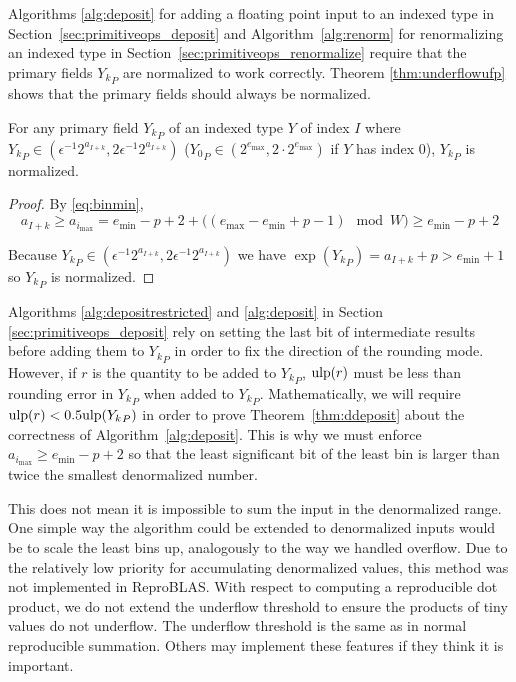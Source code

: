       Algorithms \ref{alg:deposit} for adding a floating point input to an
      indexed type in Section~\ref{sec:primitiveops_deposit} and
      Algorithm~\ref{alg:renorm} for renormalizing an indexed type in
      Section~\ref{sec:primitiveops_renormalize} require that the primary
      fields ${Y_k}_P$ are normalized to work correctly. Theorem
      \ref{thm:underflowufp} shows that the primary fields should always be
      normalized.

      \begin{samepage}
      \begin{thm}
        For any primary field ${Y_k}_P$ of an indexed type $Y$ of index $I$ where ${Y_k}_P \in (\epsilon^{-1} 2^{a_{I + k}}, 2 \epsilon^{-1} 2^{a_{I + k}})$ (${Y_0}_P \in (2^{e_{\max}}, 2 \cdot 2^{e_{\max}})$ if $Y$ has index 0), ${Y_k}_P$ is normalized.
        \label{thm:underflowufp}
      \end{thm}
      \end{samepage}

      \begin{proof}
        By \eqref{eq:binmin},
        \[
        a_{I + k} \geq a_{i_{\max}} = e_{\min} - p + 2 + \bigl((e_{\max} - e_{\min} + p - 1) \mod W\bigr) \geq e_{\min} - p + 2
        \]

        Because ${Y_k}_P \in (\epsilon^{-1} 2^{a_{I + k}}, 2 \epsilon^{-1} 2^{a_{I + k}})$ we have $\exp({Y_k}_P) = a_{I + k} + p > e_{\min} + 1$ so ${Y_k}_P$ is normalized.
      \end{proof}

      Algorithms \ref{alg:depositrestricted} and \ref{alg:deposit} in Section \ref{sec:primitiveops_deposit} rely on
      setting the last bit of intermediate results before adding them to
      ${Y_k}_P$ in order to fix the direction of the rounding mode. However, if
      $r$ is the quantity to be added to ${Y_k}_P$, $\text{ulp}(r)$ must be less than
      rounding error in ${Y_k}_P$ when added to ${Y_k}_P$.
      Mathematically, we will require $\text{ulp}(r) < 0.5\text{ulp}({Y_k}_P)$ in order to
      prove Theorem~\ref{thm:ddeposit} about the correctness of
      Algorithm~\ref{alg:deposit}.  This is why we must enforce $a_{i_{\max}}
      \geq e_{\min} - p + 2$ so that the least significant bit of the least bin
      is larger than twice the smallest denormalized number.

      This does not mean it is impossible to sum the input in the denormalized range. One simple way
      the algorithm could be extended to denormalized inputs would be to scale
      the least bins up, analogously to the way we handled overflow. Due to the
      relatively low priority for accumulating denormalized values, this method
      was not implemented in ReproBLAS. With respect to computing a reproducible dot product, we do not extend the underflow threshold to ensure the products of tiny values do not underflow. The underflow threshold is the same as in normal reproducible summation. Others may implement these features if they think it is important.


